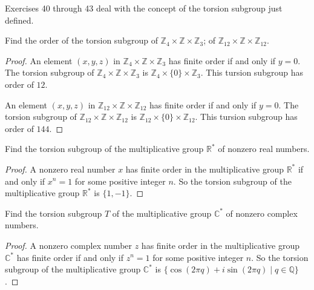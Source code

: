 Exercises 40 through 43 deal with the concept of the torsion subgroup just defined.

\newpage
\begin{exercise}
    Find the order of the torsion subgroup of $\mathbb{Z}_{4} \times \mathbb{Z} \times \mathbb{Z}_{3}$; of $\mathbb{Z}_{12} \times \mathbb{Z} \times \mathbb{Z}_{12}$.
\end{exercise}

\begin{proof}
    An element $(x, y, z)$ in $\mathbb{Z}_{4} \times \mathbb{Z} \times \mathbb{Z}_{3}$ has finite order if and only if $y = 0$. The torsion subgroup of $\mathbb{Z}_{4} \times \mathbb{Z} \times \mathbb{Z}_{3}$ is $\mathbb{Z}_{4} \times \{0\} \times \mathbb{Z}_{3}$. This tursion subgroup has order of $12$.

    An element $(x, y, z)$ in $\mathbb{Z}_{12} \times \mathbb{Z} \times \mathbb{Z}_{12}$ has finite order if and only if $y = 0$. The torsion subgroup of $\mathbb{Z}_{12} \times \mathbb{Z} \times \mathbb{Z}_{12}$ is $\mathbb{Z}_{12} \times \{0\} \times \mathbb{Z}_{12}$. This tursion subgroup has order of $144$.
\end{proof}

\newpage
\begin{exercise}
    Find the torsion subgroup of the multiplicative group $\mathbb{R}^{*}$ of nonzero real numbers.
\end{exercise}

\begin{proof}
    A nonzero real number $x$ has finite order in the multiplicative group $\mathbb{R}^{*}$ if and only if $x^{n} = 1$ for some positive integer $n$. So the torsion subgroup of the multiplicative group $\mathbb{R}^{*}$ is $\{ 1, -1 \}$.
\end{proof}

\newpage
\begin{exercise}
    Find the torsion subgroup $T$ of the multiplicative group $\mathbb{C}^{*}$ of nonzero complex numbers.
\end{exercise}

\begin{proof}
    A nonzero complex number $z$ has finite order in the multiplicative group $\mathbb{C}^{*}$ has finite order if and only if $z^{n} = 1$ for some positive integer $n$. So the torsion subgroup of the multiplicative group $\mathbb{C}^{*}$ is $\{ \cos(2\pi q) + i\sin(2\pi q) \mid q\in\mathbb{Q} \}$.
\end{proof}

